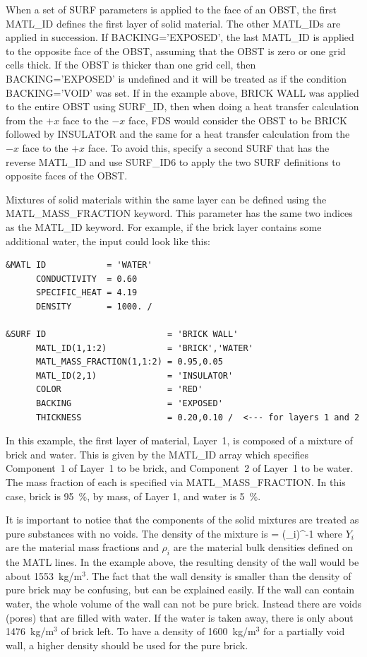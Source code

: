 \documentclass[11pt]{book}
\begin{document}
When a set of {\ct SURF} parameters is applied to the face of an {\ct OBST}, the first {\ct MATL\_ID} defines the first layer of solid material. The other {\ct MATL\_ID}s are applied in succession. If {\ct BACKING='EXPOSED'}, the last {\ct MATL\_ID} is applied to the opposite face of the {\ct OBST}, assuming that the {\ct OBST} is zero or one grid cells thick. If the {\ct OBST} is thicker than one grid cell, then {\ct BACKING='EXPOSED'} is undefined and it will be treated as if the condition {\ct BACKING='VOID'} was set. If in the example above, {\ct BRICK WALL} was applied to the entire {\ct OBST} using {\ct SURF\_ID}, then when doing a heat transfer calculation from the $+x$ face to the $-x$ face, FDS would consider the {\ct OBST} to be {\ct BRICK} followed by {\ct INSULATOR} and the same for a heat transfer
calculation from the $-x$ face to the $+x$ face.  To avoid this, specify a second {\ct SURF} that has the reverse {\ct MATL\_ID} and use {\ct SURF\_ID6} to apply the two {\ct SURF} definitions to opposite faces of the {\ct OBST}.

Mixtures of solid materials within the same layer can be defined using
the {\ct MATL\_MASS\_FRACTION} keyword. This parameter has the same
two indices as the {\ct MATL\_ID} keyword. For example, if the
brick layer contains some additional water, the input could look like this:
\begin{lstlisting}
&MATL ID            = 'WATER'
      CONDUCTIVITY  = 0.60
      SPECIFIC_HEAT = 4.19
      DENSITY       = 1000. /

&SURF ID                        = 'BRICK WALL'
      MATL_ID(1,1:2)            = 'BRICK','WATER'
      MATL_MASS_FRACTION(1,1:2) = 0.95,0.05
      MATL_ID(2,1)              = 'INSULATOR'
      COLOR                     = 'RED'
      BACKING                   = 'EXPOSED'
      THICKNESS                 = 0.20,0.10 /  <--- for layers 1 and 2
\end{lstlisting}
In this example, the first layer of material, Layer~1, is composed of a mixture of
brick and water. This is given by the {\ct MATL\_ID} array which specifies
Component~1 of Layer~1 to be brick, and Component~2 of
Layer~1 to be water. The mass fraction of each is specified via {\ct MATL\_MASS\_FRACTION}. In this
case, brick is 95~\%, by mass, of Layer 1, and water is 5~\%.

It is important to notice that the components of the solid mixtures
are treated as pure substances with no voids. The density of the
mixture is
\be
\rho = \left(\sum_i\right)^{-1}
\ee
where $Y_i$ are the material mass fractions and $\rho_i$ are the
material bulk densities defined on the {\ct MATL} lines. In the
example above, the resulting density of the wall would be about
1553~kg/m$^3$. The fact that the wall density is smaller than the
density of pure brick may be confusing, but can be explained easily.
If the wall can contain water, the whole volume of the wall can not be
pure brick. Instead there are voids (pores) that are
filled with water. If the water is taken away, there is only about
1476~kg/m$^3$ of brick left. To have a density of 1600~kg/m$^3$ for a
partially void wall, a higher density should be used for the pure
brick.
\end{document}
